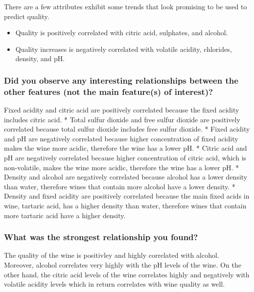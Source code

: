 \documentclass[]{article}
\providecommand{\tightlist}{%
  \setlength{\itemsep}{0pt}\setlength{\parskip}{0pt}}
\begin{document}
There are a few attributes exhibit some trends that look promising to be
used to predict quality.

\begin{itemize}
\tightlist
\item
  Quality is positively correlated with citric acid, sulphates, and
  alcohol.
\item
  Quality increases is negatively correlated with volatile acidity,
  chlorides, density, and pH.
\end{itemize}

\subsubsection{Did you observe any interesting relationships between the
other features (not the main feature(s) of
interest)?}\label{did-you-observe-any-interesting-relationships-between-the-other-features-not-the-main-features-of-interest}

Fixed acidity and citric acid are positively correlated because the
fixed acidity includes citric acid. * Total sulfur dioxide and free
sulfur dioxide are positively correlated because total sulfur dioxide
includes free sulfur dioxide. * Fixed acidity and pH are negatively
correlated because higher concentration of fixed acidity makes the wine
more acidic, therefore the wine has a lower pH. * Citric acid and pH are
negatively correlated because higher concentration of citric acid, which
is non-volatile, makes the wine more acidic, therefore the wine has a
lower pH. * Density and alcohol are negatively correlated because
alcohol has a lower density than water, therefore wines that contain
more alcohol have a lower density. * Density and fixed acidity are
positively correlated because the main fixed acids in wine, tartaric
acid, has a higher density than water, therefore wines that contain more
tartaric acid have a higher density.

\subsubsection{What was the strongest relationship you
found?}\label{what-was-the-strongest-relationship-you-found}

The quality of the wine is positivley and highly correlated with
alcohol. Moreover, alcohol correlates very highly with the pH levels of
the wine. On the other hand, the citric acid levels of the wine
correlates highly and negatively with volatile acidity levels which in
return correlates with wine quality as well.
\end{document}
